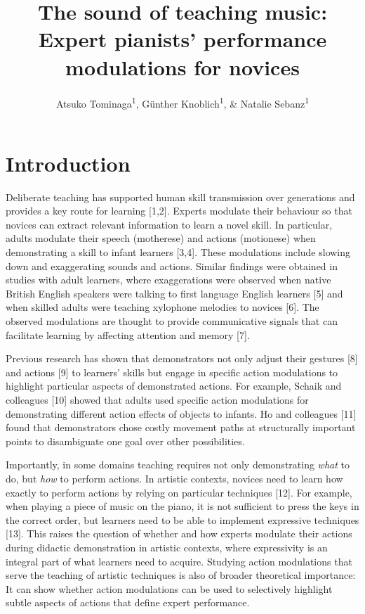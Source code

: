 \documentclass[
  english,
  man,floatsintext]{apa6}
\title{The sound of teaching music: Expert pianists' performance modulations for novices}
\author{Atsuko Tominaga\textsuperscript{1}, Günther Knoblich\textsuperscript{1}, \& Natalie Sebanz\textsuperscript{1}}
\date{}
\affiliation{\vspace{0.5cm}\textsuperscript{1} Department of Cognitive Science, Central European University, Vienna, Austria}
\begin{document}
\maketitle

\hypertarget{introduction}{%
\section{Introduction}\label{introduction}}

Deliberate teaching has supported human skill transmission over generations and provides a key route for learning {[}1,2{]}. Experts modulate their behaviour so that novices can extract relevant information to learn a novel skill. In particular, adults modulate their speech (motherese) and actions (motionese) when demonstrating a skill to infant learners {[}3,4{]}. These modulations include slowing down and exaggerating sounds and actions. Similar findings were obtained in studies with adult learners, where exaggerations were observed when native British English speakers were talking to first language English learners {[}5{]} and when skilled adults were teaching xylophone melodies to novices {[}6{]}. The observed modulations are thought to provide communicative signals that can facilitate learning by affecting attention and memory {[}7{]}.

Previous research has shown that demonstrators not only adjust their gestures {[}8{]} and actions {[}9{]} to learners' skills but engage in specific action modulations to highlight particular aspects of demonstrated actions. For example, Schaik and colleagues {[}10{]} showed that adults used specific action modulations for demonstrating different action effects of objects to infants. Ho and colleagues {[}11{]} found that demonstrators chose costly movement paths at structurally important points to disambiguate one goal over other possibilities.

Importantly, in some domains teaching requires not only demonstrating \emph{what} to do, but \emph{how} to perform actions. In artistic contexts, novices need to learn how exactly to perform actions by relying on particular techniques {[}12{]}. For example, when playing a piece of music on the piano, it is not sufficient to press the keys in the correct order, but learners need to be able to implement expressive techniques {[}13{]}. This raises the question of whether and how experts modulate their actions during didactic demonstration in artistic contexts, where expressivity is an integral part of what learners need to acquire. Studying action modulations that serve the teaching of artistic techniques is also of broader theoretical importance: It can show whether action modulations can be used to selectively highlight subtle aspects of actions that define expert performance.
\end{document}

